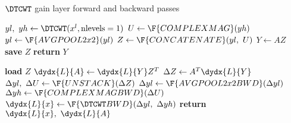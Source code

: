 \begin{algorithm}[t]
\caption{$\DTCWT$ gain layer forward and backward passes}\label{alg:ch6:gain}
\begin{algorithmic}[1]
  \State $yl,\ yh \gets \DTCWT(x^l, \mbox{nlevels}=1) $ 
  \State $U \gets \F{COMPLEXMAG}(yh)$
  \State $yl \gets \F{AVGPOOL2x2}(yl)$  
  \State $Z \gets \F{CONCATENATE}(yl,\ U)$ 
  \State $Y \gets AZ$ 
  \State \textbf{save} $Z$ 
  \State \textbf{return} $Y$ 
\EndProcedure
\end{algorithmic}\vspace{10pt}
\begin{algorithmic}[1]
  \State \textbf{load} $Z$
  \State $\dydx{L}{A} \gets \dydx{L}{Y} Z^T$ 
  \State $\Delta{Z} \gets A^T\dydx{L}{Y}$
  \State $\Delta yl,\ \Delta U \gets \F{UNSTACK}(\Delta Z)$ 
  \State $\Delta yl \gets \F{AVGPOOL2x2BWD}(\Delta yl)$
  \State $\Delta yh \gets \F{COMPLEXMAGBWD}(\Delta U)$
  \State $\dydx{L}{x} \gets \F{\DTCWT BWD}(\Delta yl,\ \Delta yh)$ 
  \State \textbf{return} $\dydx{L}{x},\ \dydx{L}{A}$
\EndProcedure
\end{algorithmic}
\end{algorithm}

